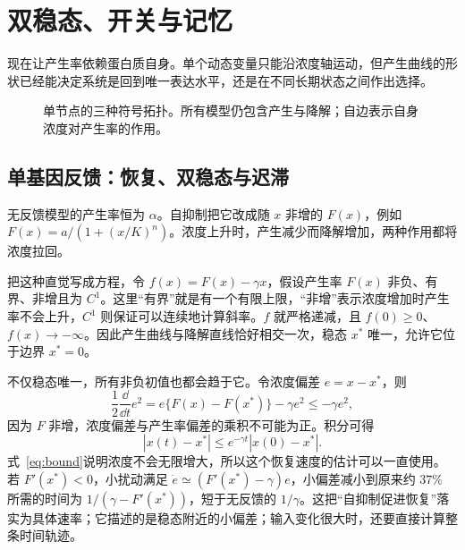 \chapter{双稳态、开关与记忆}
现在让产生率依赖蛋白质自身。单个动态变量只能沿浓度轴运动，但产生曲线的形状已经能决定系统是回到唯一表达水平，还是在不同长期状态之间作出选择。

\begin{figure}[H]\centering
{}
\caption{单节点的三种符号拓扑。所有模型仍包含产生与降解；自边表示自身浓度对产生率的作用。}
\end{figure}
\section{单基因反馈：恢复、双稳态与迟滞}
无反馈模型的产生率恒为 $\alpha$。自抑制把它改成随 $x$ 非增的 $F(x)$，例如 $F(x)=a/(1+(x/K)^n)$。浓度上升时，产生减少而降解增加，两种作用都将浓度拉回。

把这种直觉写成方程，令 $f(x)=F(x)-\gamma x$，假设产生率 $F(x)$ 非负、有界、非增且为 $C^1$。这里“有界”就是有一个有限上限，“非增”表示浓度增加时产生率不会上升，$C^1$ 则保证可以连续地计算斜率。$f$ 就严格递减，且 $f(0)\geq0$、$f(x)\to-\infty$。因此产生曲线与降解直线恰好相交一次，稳态 $x^*$ 唯一，允许它位于边界 $x^*=0$。

不仅稳态唯一，所有非负初值也都会趋于它。令浓度偏差 $e=x-x^*$，则
\[
\frac12\frac{\dd}{\dd t}e^2=e\{F(x)-F(x^*)\}-\gamma e^2\leq-\gamma e^2,
\]
因为 $F$ 非增，浓度偏差与产生率偏差的乘积不可能为正。积分可得
\[
|x(t)-x^*|\leq e^{-\gamma t}|x(0)-x^*|.
\]
式~\eqref{eq:bound}说明浓度不会无限增大，所以这个恢复速度的估计可以一直使用。若 $F'(x^*)<0$，小扰动满足 $\dot e\simeq(F'(x^*)-\gamma)e$，小偏差减小到原来约 $37\%$ 所需的时间为 $1/(\gamma-F'(x^*))$，短于无反馈的 $1/\gamma$。这把“自抑制促进恢复”落实为具体速率；它描述的是稳态附近的小偏差；输入变化很大时，还要直接计算整条时间轨迹。


